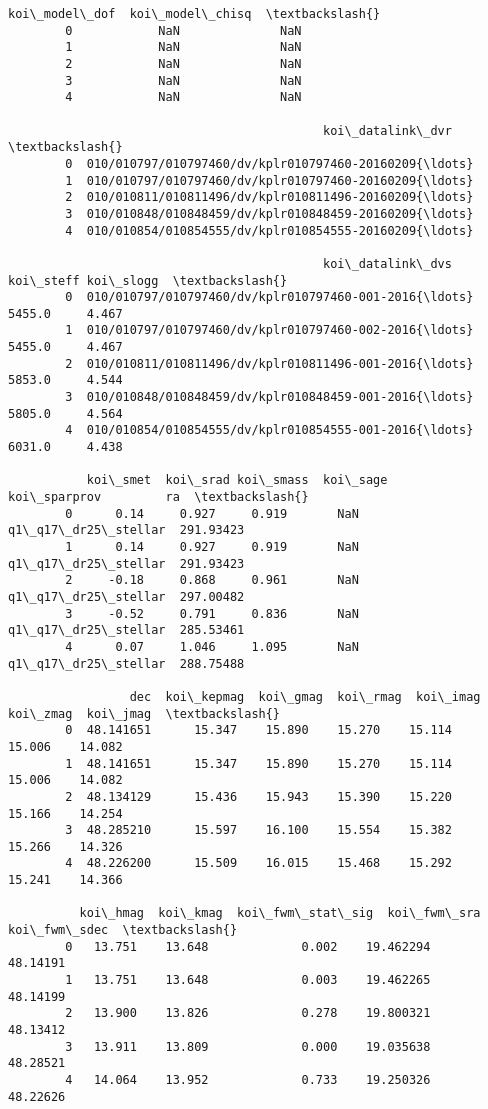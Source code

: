 \documentclass[11pt]{article}
\begin{document}
\begin{Verbatim}[commandchars=\\\{\}]
           koi\_model\_dof  koi\_model\_chisq  \textbackslash{}
        0            NaN              NaN   
        1            NaN              NaN   
        2            NaN              NaN   
        3            NaN              NaN   
        4            NaN              NaN   
        
                                            koi\_datalink\_dvr  \textbackslash{}
        0  010/010797/010797460/dv/kplr010797460-20160209{\ldots}   
        1  010/010797/010797460/dv/kplr010797460-20160209{\ldots}   
        2  010/010811/010811496/dv/kplr010811496-20160209{\ldots}   
        3  010/010848/010848459/dv/kplr010848459-20160209{\ldots}   
        4  010/010854/010854555/dv/kplr010854555-20160209{\ldots}   
        
                                            koi\_datalink\_dvs  koi\_steff koi\_slogg  \textbackslash{}
        0  010/010797/010797460/dv/kplr010797460-001-2016{\ldots}     5455.0     4.467   
        1  010/010797/010797460/dv/kplr010797460-002-2016{\ldots}     5455.0     4.467   
        2  010/010811/010811496/dv/kplr010811496-001-2016{\ldots}     5853.0     4.544   
        3  010/010848/010848459/dv/kplr010848459-001-2016{\ldots}     5805.0     4.564   
        4  010/010854/010854555/dv/kplr010854555-001-2016{\ldots}     6031.0     4.438   
        
           koi\_smet  koi\_srad koi\_smass  koi\_sage         koi\_sparprov         ra  \textbackslash{}
        0      0.14     0.927     0.919       NaN  q1\_q17\_dr25\_stellar  291.93423   
        1      0.14     0.927     0.919       NaN  q1\_q17\_dr25\_stellar  291.93423   
        2     -0.18     0.868     0.961       NaN  q1\_q17\_dr25\_stellar  297.00482   
        3     -0.52     0.791     0.836       NaN  q1\_q17\_dr25\_stellar  285.53461   
        4      0.07     1.046     1.095       NaN  q1\_q17\_dr25\_stellar  288.75488   
        
                 dec  koi\_kepmag  koi\_gmag  koi\_rmag  koi\_imag  koi\_zmag  koi\_jmag  \textbackslash{}
        0  48.141651      15.347    15.890    15.270    15.114    15.006    14.082   
        1  48.141651      15.347    15.890    15.270    15.114    15.006    14.082   
        2  48.134129      15.436    15.943    15.390    15.220    15.166    14.254   
        3  48.285210      15.597    16.100    15.554    15.382    15.266    14.326   
        4  48.226200      15.509    16.015    15.468    15.292    15.241    14.366   
        
          koi\_hmag  koi\_kmag  koi\_fwm\_stat\_sig  koi\_fwm\_sra  koi\_fwm\_sdec  \textbackslash{}
        0   13.751    13.648             0.002    19.462294      48.14191   
        1   13.751    13.648             0.003    19.462265      48.14199   
        2   13.900    13.826             0.278    19.800321      48.13412   
        3   13.911    13.809             0.000    19.035638      48.28521   
        4   14.064    13.952             0.733    19.250326      48.22626   
        

\end{Verbatim}
\end{document}
